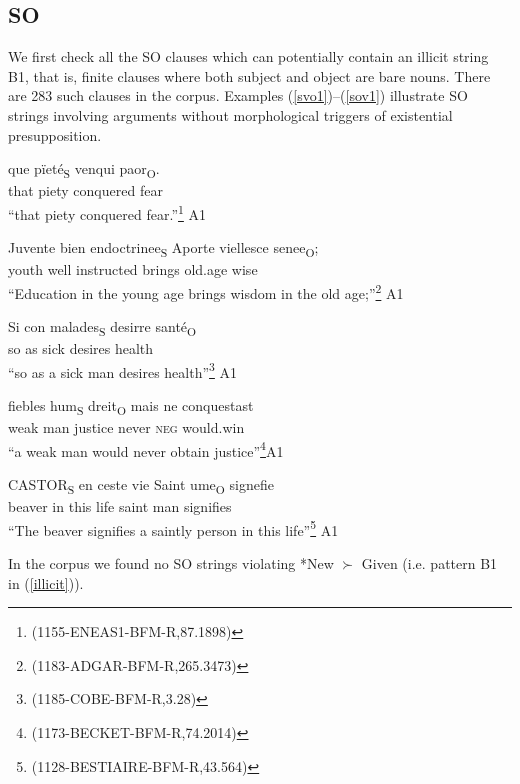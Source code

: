 \documentclass[output=paper,modfonts,nonflat]{langsci/langscibook}
\begin{document}
\subsection{SO}

We first check all the SO clauses which can potentially contain an illicit string B1, that is, finite clauses where both subject and object are bare nouns. There are 283 such clauses in the corpus. Examples (\ref{svo1})--(\ref{sov1}) illustrate SO strings involving arguments without morphological triggers of existential presupposition.%

\ea 
\gll que p\"{i}et\'{e}\textsubscript{S} venqui paor\textsubscript{O}.\\
that piety conquered fear\\
\glt ``that piety conquered fear.''\footnote{(1155-ENEAS1-BFM-R,87.1898)}\label{svo1} \hfill A1
\z

\ea
\gll Juvente bien endoctrinee\textsubscript{S} Aporte viellesce senee\textsubscript{O};\\
youth well instructed brings old.age wise\\
\glt ``Education in the young age brings wisdom in the old age;''\footnote{{(1183-ADGAR-BFM-R,265.3473)}}\label{svo2} \hfill A1
\z

\ea
\gll Si con malades\textsubscript{S} desirre sant\'{e}\textsubscript{O} \\ %
so as sick desires health\\
\glt ``so as a sick man desires health''\footnote{{(1185-COBE-BFM-R,3.28)}}\label{svo3} \hfill A1
\z 

\ea
\gll fiebles hum\textsubscript{S} dreit\textsubscript{O} mais ne conquestast\\
weak man justice never {\scshape neg} would.win\\
\glt ``a weak man would never obtain justice''\footnote{{(1173-BECKET-BFM-R,74.2014)}}\hfill A1
\z

\ea
\gll CASTOR\textsubscript{S} en ceste vie Saint ume\textsubscript{O} signefie\\
beaver in this life saint man signifies\\
\glt ``The beaver signifies a saintly person in this life''\footnote{{(1128-BESTIAIRE-BFM-R,43.564)}} \label{sov1} \hfill A1
\z

In the corpus we found no SO strings violating *New $\succ$ Given (i.e. pattern B1 in (\ref{illicit})).
\end{document}
